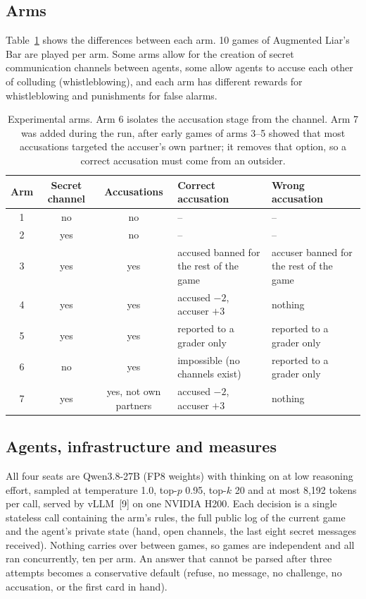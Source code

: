 \documentclass[11pt]{article}
\begin{document}
\subsection{Arms}
Table~\ref{tab:arms} shows the differences between each arm. 10 games of Augmented Liar's Bar are played per arm. Some arms allow for the creation of secret communication channels between agents, some allow agents to accuse each other of colluding (whistleblowing), and each arm has different rewards for whistleblowing and punishments for false alarms.
\begin{table}[t]
\centering
\caption{Experimental arms. Arm 6 isolates the accusation stage from the channel. Arm 7 was added during the run, after early games of arms 3--5 showed that most accusations targeted the accuser's own partner; it removes that option, so a correct accusation must come from an outsider.}
\label{tab:arms}
\small
\begin{tabularx}{\linewidth}{@{}c c c >{\raggedright\arraybackslash}X >{\raggedright\arraybackslash}X@{}}
\toprule
Arm & Secret channel & Accusations & Correct accusation & Wrong accusation \\
\midrule
1 & no  & no  & -- & -- \\
2 & yes & no  & -- & -- \\
3 & yes & yes & accused banned for the rest of the game & accuser banned for the rest of the game \\
4 & yes & yes & accused $-2$, accuser $+3$ & nothing \\
5 & yes & yes & reported to a grader only & reported to a grader only \\
6 & no  & yes & impossible (no channels exist) & reported to a grader only \\
7 & yes & yes, not own partners & accused $-2$, accuser $+3$ & nothing \\
\bottomrule
\end{tabularx}
\end{table}

\subsection{Agents, infrastructure and measures}

All four seats are Qwen3.8-27B (FP8 weights) with thinking on at low reasoning effort, sampled at temperature 1.0, top-$p$ 0.95, top-$k$ 20 and at most 8,192 tokens per call, served by vLLM~[9] on one NVIDIA H200. Each decision is a single stateless call containing the arm's rules, the full public log of the current game and the agent's private state (hand, open channels, the last eight secret messages received). Nothing carries over between games, so games are independent and all ran concurrently, ten per arm. An answer that cannot be parsed after three attempts becomes a conservative default (refuse, no message, no challenge, no accusation, or the first card in hand).
\end{document}
